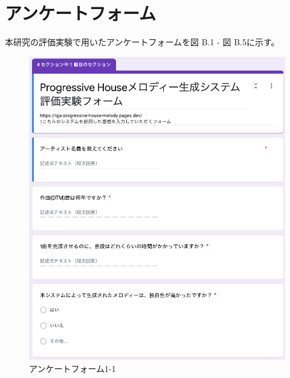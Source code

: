 \chapter{アンケートフォーム}
本研究の評価実験で用いたアンケートフォームを図 B.1 - 図 B.5に示す。

\begin{figure}[htbp]
	\begin{center}
		\includegraphics[width=14.5cm]{image/forms/form1.png}
		\caption{アンケートフォーム1-1}
	\end{center}
\end{figure}

